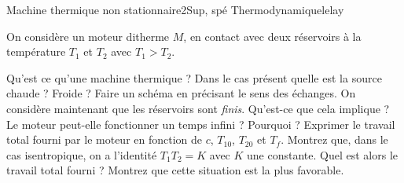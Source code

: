 \begin{exercise}{Machine thermique non stationnaire}{2}{Sup, spé}
{Thermodynamique}{lelay}

On considère un moteur ditherme $M$, en contact avec deux réservoirs à la température $T_1$ et $T_2$ avec $T_1 > T_2$.

\begin{questions}
    \questioncours Qu'est ce qu'une machine thermique ?
    \question Dans le cas présent quelle est la source chaude ? Froide ? Faire un schéma en précisant le sens des échanges.
    \question On considère maintenant que les réservoirs sont \emph{finis}. Qu'est-ce que cela implique ? 
    \question Le moteur peut-elle fonctionner un temps infini ? Pourquoi ?
    \question Exprimer le travail total fourni par le moteur en fonction de $c$, $T_{10}$, $T_{20}$ et $T_f$.
    \question Montrez que, dans le cas isentropique, on a l'identité $T_1T_2 = K$ avec $K$ une constante. Quel est alors le travail total fourni ?
    \question Montrez que cette situation est la plus favorable.
\end{questions}

\end{exercise}

